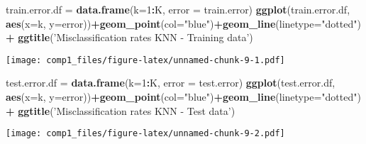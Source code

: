 \documentclass[]{article}
\newenvironment{Shaded}{\begin{snugshade}}{\end{snugshade}}
\newcommand{\KeywordTok}[1]{\textcolor[rgb]{0.13,0.29,0.53}{\textbf{#1}}}
\newcommand{\DataTypeTok}[1]{\textcolor[rgb]{0.13,0.29,0.53}{#1}}
\newcommand{\DecValTok}[1]{\textcolor[rgb]{0.00,0.00,0.81}{#1}}
\newcommand{\StringTok}[1]{\textcolor[rgb]{0.31,0.60,0.02}{#1}}
\newcommand{\OperatorTok}[1]{\textcolor[rgb]{0.81,0.36,0.00}{\textbf{#1}}}
\newcommand{\NormalTok}[1]{#1}
\begin{document}
\begin{Shaded}
\begin{Highlighting}[]
\NormalTok{train.error.df =}\StringTok{ }\KeywordTok{data.frame}\NormalTok{(}\DataTypeTok{k=}\DecValTok{1}\OperatorTok{:}\NormalTok{K, }\DataTypeTok{error =}\NormalTok{ train.error)}
\KeywordTok{ggplot}\NormalTok{(train.error.df, }\KeywordTok{aes}\NormalTok{(}\DataTypeTok{x=}\NormalTok{k, }\DataTypeTok{y=}\NormalTok{error))}\OperatorTok{+}\KeywordTok{geom_point}\NormalTok{(}\DataTypeTok{col=}\StringTok{"blue"}\NormalTok{)}\OperatorTok{+}\KeywordTok{geom_line}\NormalTok{(}\DataTypeTok{linetype=}\StringTok{"dotted"}\NormalTok{) }\OperatorTok{+}\StringTok{ }\KeywordTok{ggtitle}\NormalTok{(}\StringTok{'Misclassification rates KNN - Training data'}\NormalTok{)}
\end{Highlighting}
\end{Shaded}

\texttt{[image: comp1\_files/figure-latex/unnamed-chunk-9-1.pdf]}

\begin{Shaded}
\begin{Highlighting}[]
\NormalTok{test.error.df =}\StringTok{ }\KeywordTok{data.frame}\NormalTok{(}\DataTypeTok{k=}\DecValTok{1}\OperatorTok{:}\NormalTok{K, }\DataTypeTok{error =}\NormalTok{ test.error)}
\KeywordTok{ggplot}\NormalTok{(test.error.df, }\KeywordTok{aes}\NormalTok{(}\DataTypeTok{x=}\NormalTok{k, }\DataTypeTok{y=}\NormalTok{error))}\OperatorTok{+}\KeywordTok{geom_point}\NormalTok{(}\DataTypeTok{col=}\StringTok{"blue"}\NormalTok{)}\OperatorTok{+}\KeywordTok{geom_line}\NormalTok{(}\DataTypeTok{linetype=}\StringTok{"dotted"}\NormalTok{) }\OperatorTok{+}\StringTok{ }\KeywordTok{ggtitle}\NormalTok{(}\StringTok{'Misclassification rates KNN - Test data'}\NormalTok{)}
\end{Highlighting}
\end{Shaded}

\texttt{[image: comp1\_files/figure-latex/unnamed-chunk-9-2.pdf]}
\end{document}
